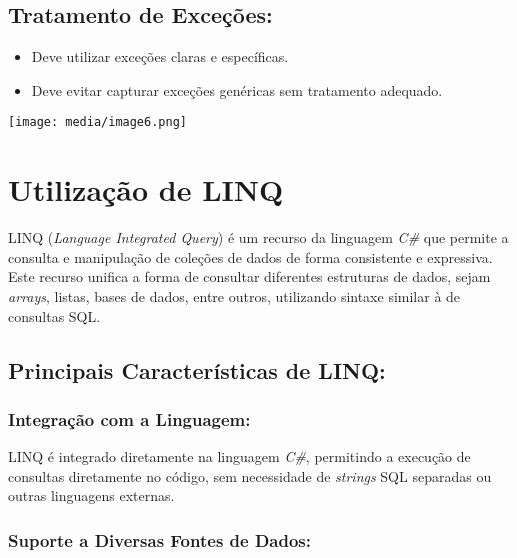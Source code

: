 \documentclass[
]{article}
\begin{document}
\hypertarget{tratamento-de-exceuxe7uxf5es}{%
\subsection{Tratamento de
Exceções:}\label{tratamento-de-exceuxe7uxf5es}}

\begin{itemize}
\item
  Deve utilizar exceções claras e específicas.
\item
  Deve evitar capturar exceções genéricas sem tratamento adequado.
\end{itemize}

\texttt{[image: media/image6.png]}

\hypertarget{utilizauxe7uxe3o-de-linq}{%
\section{Utilização de LINQ}\label{utilizauxe7uxe3o-de-linq}}

LINQ (\emph{Language Integrated Query}) é um recurso da linguagem
\emph{C\#} que permite a consulta e manipulação de coleções de dados de
forma consistente e expressiva. Este recurso unifica a forma de
consultar diferentes estruturas de dados, sejam \emph{arrays}, listas,
bases de dados, entre outros, utilizando sintaxe similar à de consultas
SQL.

\hypertarget{principais-caracteruxedsticas-de-linq}{%
\subsection{Principais Características de
LINQ:}\label{principais-caracteruxedsticas-de-linq}}

\hypertarget{integrauxe7uxe3o-com-a-linguagem}{%
\subsubsection{Integração com a
Linguagem:}\label{integrauxe7uxe3o-com-a-linguagem}}

LINQ é integrado diretamente na linguagem \emph{C\#}, permitindo a
execução de consultas diretamente no código, sem necessidade de
\emph{strings} SQL separadas ou outras linguagens externas.

\hypertarget{suporte-a-diversas-fontes-de-dados}{%
\subsubsection{Suporte a Diversas Fontes de
Dados:}\label{suporte-a-diversas-fontes-de-dados}}
\end{document}
